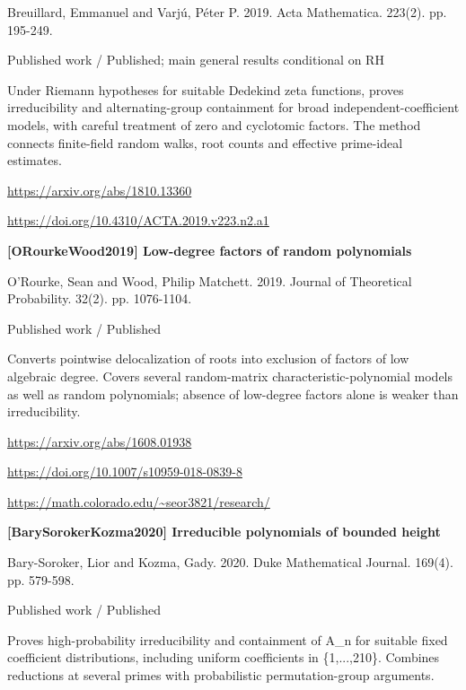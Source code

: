 \documentclass[11pt,a4paper,oneside,openany]{book}
\begin{document}
\color{black} Breuillard, Emmanuel and Varjú, Péter P. 2019. Acta Mathematica. 223(2). pp. 195-249.\par
{\small\sffamily\color{atlasgold}Published work / Published; main general results conditional on RH}\par
\color{black} Under Riemann hypotheses for suitable Dedekind zeta functions, proves irreducibility and alternating-group containment for broad independent-coefficient models, with careful treatment of zero and cyclotomic factors. The method connects finite-field random walks, root counts and effective prime-ideal estimates.\par
{\footnotesize\url{https://arxiv.org/abs/1810.13360}}\par
{\footnotesize\url{https://doi.org/10.4310/ACTA.2019.v223.n2.a1}}\par
\vspace{9pt}
\hypertarget{ref:ORourkeWood2019}{}
{\sffamily\bfseries\color{atlasgreen}[ORourkeWood2019] Low-degree factors of random polynomials}\par
\color{black} O'Rourke, Sean and Wood, Philip Matchett. 2019. Journal of Theoretical Probability. 32(2). pp. 1076-1104.\par
{\small\sffamily\color{atlasgold}Published work / Published}\par
\color{black} Converts pointwise delocalization of roots into exclusion of factors of low algebraic degree. Covers several random-matrix characteristic-polynomial models as well as random polynomials; absence of low-degree factors alone is weaker than irreducibility.\par
{\footnotesize\url{https://arxiv.org/abs/1608.01938}}\par
{\footnotesize\url{https://doi.org/10.1007/s10959-018-0839-8}}\par
{\footnotesize\url{https://math.colorado.edu/~seor3821/research/}}\par
\vspace{9pt}
\hypertarget{ref:BarySorokerKozma2020}{}
{\sffamily\bfseries\color{atlasgreen}[BarySorokerKozma2020] Irreducible polynomials of bounded height}\par
\color{black} Bary-Soroker, Lior and Kozma, Gady. 2020. Duke Mathematical Journal. 169(4). pp. 579-598.\par
{\small\sffamily\color{atlasgold}Published work / Published}\par
\color{black} Proves high-probability irreducibility and containment of A\_\allowbreak{}n for suitable fixed coefficient distributions, including uniform coefficients in \{1,...,210\}. Combines reductions at several primes with probabilistic permutation-group arguments.\par
\end{document}

